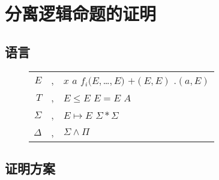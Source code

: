 \chapter{分离逻辑命题的证明}
\label{chap:sep}

\section{语言}
\begin{figure}[!htbp]
  \centering
  \begin{tabular}[rcl]{rcl}
    $E$ & \sep{} & $x$ \deli{} $a$ \deli{} $f_i(E,$\ldots$,E)$ \deli{} $+(E, E)$ \deli{} $.(a,E)$ \\
    $T$ & \sep{} & $E \le E$ \deli{} $E = E$ \deli{} $A$ \\
    $\Sigma$ & \sep{} & $E \mapsto E$ \deli{} $\Sigma \ast \Sigma$ \\
    $\Delta$ & \sep{} & $\Sigma \land \Pi$ \\
  \end{tabular}
\end{figure}

\section{证明方案}
